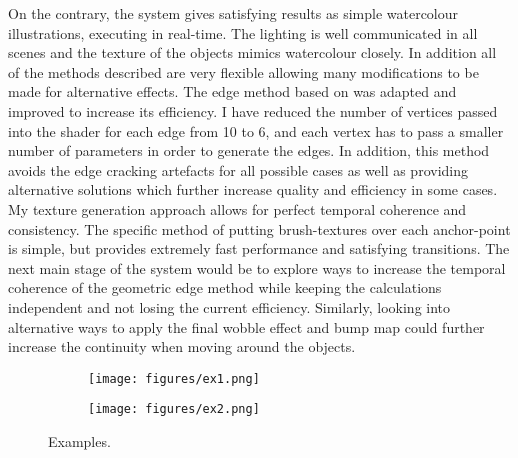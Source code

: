 \documentclass[a4paper, 12pt]{article}
\begin{document}
On the contrary, the system gives satisfying results as simple watercolour illustrations, executing in real-time. The lighting is well communicated in all scenes and the texture of the objects mimics watercolour closely. In addition all of the methods described are very flexible allowing many modifications to be made for alternative effects. The edge method based on \cite{Hughes2004} was adapted and improved to increase its efficiency. I have reduced the number of vertices passed into the shader for each edge from 10 to 6, and each vertex has to pass a smaller number of parameters in order to generate the edges. In addition, this method avoids the edge cracking artefacts for all possible cases as well as providing alternative solutions which further increase quality and efficiency in some cases. My texture generation approach allows for perfect temporal coherence and consistency. The specific method of putting brush-textures over each anchor-point is simple, but provides extremely fast performance and satisfying transitions. The next main stage of the system would be to explore ways to increase the temporal coherence of the geometric edge method while keeping the calculations independent and not losing the current efficiency. Similarly, looking into alternative ways to apply the final wobble effect and bump map could further increase the continuity when moving around the objects.

\printbibliography

\begin{figure}[htbp!]
  \centering
  \begin{subfigure}{0.6\columnwidth}
    \texttt{[image: figures/ex1.png]}
  \end{subfigure}
  \begin{subfigure}{0.6\columnwidth}
    \texttt{[image: figures/ex2.png]}
  \end{subfigure}  \caption{Examples.}
\end{figure}
\end{document}

